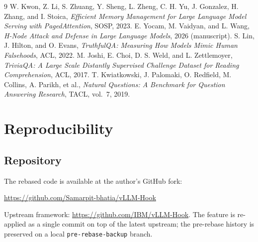 \documentclass[11pt]{article}
\begin{document}
\begin{thebibliography}{9}
 W. Kwon, Z. Li, S. Zhuang, Y. Sheng, L. Zheng, C. H. Yu, J. Gonzalez,
H. Zhang, and I. Stoica, \emph{Efficient Memory Management for Large Language Model Serving
with PagedAttention}, SOSP, 2023.
 E. Yocam, M. Vaidyan, and L. Wang, \emph{H-Node Attack and Defense in Large
Language Models}, 2026 (manuscript).
 S. Lin, J. Hilton, and O. Evans, \emph{TruthfulQA: Measuring How Models
Mimic Human Falsehoods}, ACL, 2022.
 M. Joshi, E. Choi, D. S. Weld, and L. Zettlemoyer, \emph{TriviaQA: A Large
Scale Distantly Supervised Challenge Dataset for Reading Comprehension}, ACL, 2017.
 T. Kwiatkowski, J. Palomaki, O. Redfield, M. Collins, A. Parikh, et al.,
\emph{Natural Questions: A Benchmark for Question Answering Research}, TACL, vol.~7, 2019.
\end{thebibliography}

\appendix
\section{Reproducibility}

\subsection{Repository}
The rebased code is available at the author's GitHub fork:
\begin{center}
\url{https://github.com/Samarpit-bhatia/vLLM-Hook}
\end{center}
Upstream framework: \url{https://github.com/IBM/vLLM-Hook}. The feature is re-applied as a
single commit on top of the latest upstream; the pre-rebase history is preserved on a local
\texttt{pre-rebase-backup} branch.
\end{document}
